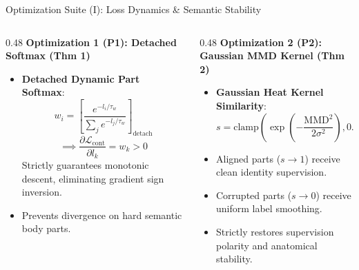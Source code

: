 \documentclass[aspectratio=169,xcolor=dvipsnames]{beamer}
\begin{document}
\begin{frame}{Optimization Suite (I): Loss Dynamics \& Semantic Stability}
\footnotesize
\begin{columns}[t,onlytextwidth]
\begin{column}{0.48\textwidth}
    \textbf{Optimization 1 (P1): Detached Softmax (Thm 1)}
    \begin{itemize}
        \setlength{\itemsep}{0.12em}
        \item \textbf{Detached Dynamic Part Softmax}:
        $$w_i = \left[ \frac{e^{-l_i / \tau_w}}{\sum_j e^{-l_j / \tau_w}} \right]_{\text{detach}}$$
        $$\implies \frac{\partial \mathcal{L}_{\text{cont}}}{\partial l_k} = w_k > 0$$
        Strictly guarantees monotonic descent, eliminating gradient sign inversion.
        \item Prevents divergence on hard semantic body parts.
    \end{itemize}
\end{column}
\begin{column}{0.48\textwidth}
    \textbf{Optimization 2 (P2): Gaussian MMD Kernel (Thm 2)}
    \begin{itemize}
        \setlength{\itemsep}{0.12em}
        \item \textbf{Gaussian Heat Kernel Similarity}:
        $$s = \text{clamp}\left( \exp\left(-\frac{\mathrm{MMD}^2}{2\sigma^2}\right), 0.01, 1.0 \right)$$
        \item Aligned parts ($s \to 1$) receive clean identity supervision.
        \item Corrupted parts ($s \to 0$) receive uniform label smoothing.
        \item Strictly restores supervision polarity and anatomical stability.
    \end{itemize}
\end{column}
\end{columns}
\end{frame}
\end{document}
